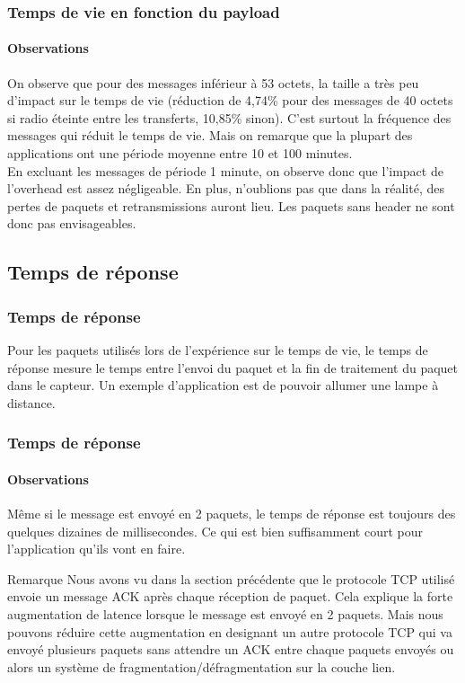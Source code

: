 \begin{frame}
 \frametitle{Temps de vie en fonction du payload}
 \framesubtitle{Observations}
 On observe que pour des messages inférieur à 53 octets, la taille a très peu d'impact sur le temps de vie
 (réduction de 4,74\% pour des messages de 40 octets si radio éteinte entre les transferts, 10,85\% sinon).
 C'est surtout la fréquence des messages qui réduit le temps de vie. Mais on remarque que la plupart des applications ont une période moyenne entre 10 et 100 minutes.\\
 \vspace{5mm}
 En excluant les messages de période 1 minute, on observe donc que l'impact de l'overhead est assez négligeable.
 En plus, n'oublions pas que dans la réalité, des pertes de paquets et retransmissions auront lieu.
 Les paquets sans header ne sont donc pas envisageables.
\end{frame}

\subsection{Temps de réponse}
\begin{frame}
 \frametitle{Temps de réponse}
 Pour les paquets utilisés lors de l'expérience sur le temps de vie, le temps de réponse mesure le temps entre l'envoi du paquet et la fin de traitement du paquet dans le capteur.
 Un exemple d'application est de pouvoir allumer une lampe à distance.
\end{frame}
 
\begin{frame}
 \frametitle{Temps de réponse}
 \framesubtitle{Observations}
 Même si le message est envoyé en 2 paquets, le temps de réponse est toujours des quelques dizaines de millisecondes.
 Ce qui est bien suffisamment court pour l'application qu'ils vont en faire.\\
 \begin{block}{Remarque}
 Nous avons vu dans la section précédente que le protocole TCP utilisé envoie un message ACK après chaque réception de paquet.
 Cela explique la forte augmentation de latence lorsque le message est envoyé en 2 paquets.
 Mais nous pouvons réduire cette augmentation en designant un autre protocole TCP qui va envoyé plusieurs paquets sans attendre un ACK entre chaque paquets envoyés ou alors un système de fragmentation/défragmentation sur la couche lien.
 \end{block}
\end{frame}